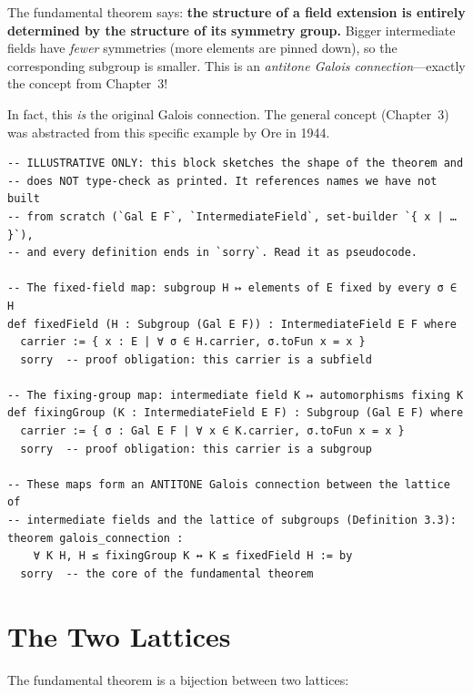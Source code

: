 \documentclass[11pt, a4paper, oneside]{book}
\begin{document}
\begin{intuition}
The fundamental theorem says: \textbf{the structure of a field extension is
entirely determined by the structure of its symmetry group.} Bigger
intermediate fields have \emph{fewer} symmetries (more elements are pinned
down), so the corresponding subgroup is smaller. This is an \emph{antitone
Galois connection}---exactly the concept from Chapter~3!

In fact, this \emph{is} the original Galois connection. The general concept
(Chapter~3) was abstracted from this specific example by Ore in 1944.
\end{intuition}

\begin{leanbox}
\begin{verbatim}
-- ILLUSTRATIVE ONLY: this block sketches the shape of the theorem and
-- does NOT type-check as printed. It references names we have not built
-- from scratch (`Gal E F`, `IntermediateField`, set-builder `{ x | … }`),
-- and every definition ends in `sorry`. Read it as pseudocode.

-- The fixed-field map: subgroup H ↦ elements of E fixed by every σ ∈ H
def fixedField (H : Subgroup (Gal E F)) : IntermediateField E F where
  carrier := { x : E | ∀ σ ∈ H.carrier, σ.toFun x = x }
  sorry  -- proof obligation: this carrier is a subfield

-- The fixing-group map: intermediate field K ↦ automorphisms fixing K
def fixingGroup (K : IntermediateField E F) : Subgroup (Gal E F) where
  carrier := { σ : Gal E F | ∀ x ∈ K.carrier, σ.toFun x = x }
  sorry  -- proof obligation: this carrier is a subgroup

-- These maps form an ANTITONE Galois connection between the lattice of
-- intermediate fields and the lattice of subgroups (Definition 3.3):
theorem galois_connection :
    ∀ K H, H ≤ fixingGroup K ↔ K ≤ fixedField H := by
  sorry  -- the core of the fundamental theorem
\end{verbatim}
\end{leanbox}

\section{The Two Lattices}

The fundamental theorem is a bijection between two lattices:
\end{document}
